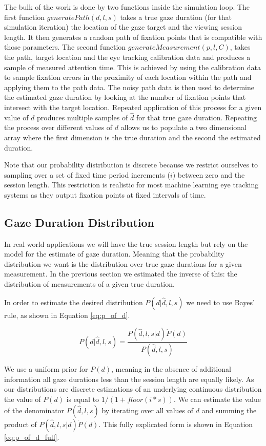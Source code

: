 \documentclass[sigconf]{acmart}
\numberwithin{equation}{section}
\begin{document}
The bulk of the work is done by two functions inside the simulation loop. The first function
$generatePath(d,l,s)$ takes a true gaze duration (for that simulation iteration) the location
of the gaze target and the viewing session length. It then
generates a random path of fixation points that is compatible with those parameters.
The second function 
$generateMeasurement(p,l,C)$, takes the path, target location and the eye tracking calibration 
data and produces a sample of measured attention time.
This is achieved by using the calibration data to sample
fixation errors in the proximity of each location within the path and applying them to the path data. 
The noisy path data is then used to determine
the estimated gaze duration by looking at the number of fixation points that intersect with the target
location.
Repeated application of this process for a given value of $d$ produces multiple samples of $\hat{d}$
for that true gaze duration. Repeating the process over different 
values of $d$ allows us to populate a two dimensional array where the first dimension is the
true duration and the second the estimated duration. 

Note that our probability distribution is discrete
because we restrict ourselves to sampling over a set of fixed time period increments ($i$) 
between zero and the session length. This restriction is realistic for most machine learning
eye tracking systems as they output fixation points at fixed intervals of time.

\subsection{Gaze Duration Distribution}

In real world applications we will have the true session length but rely on the model for the 
estimate of gaze duration. Meaning that the probability distribution we want is the distribution 
over true gaze durations for a given measurement. In the previous section we estimated the inverse of
this: the distribution of measurements of a given true duration. 

In order to estimate the desired distribution $P(d|\hat{d},l,s)$ we need to use 
Bayes' rule, as shown in Equation \ref{eq:p_of_d}.

\begin{equation}
\label{eq:p_of_d}
P(d|\hat{d},l,s) =  \frac{ P(\hat{d},l,s|d) \dot P(d) }{ P(\hat{d},l,s)  }
\end{equation}

We use a uniform prior for $P(d)$, meaning in the absence of additional information all
gaze durations less than the session length are equally likely. As our distributions are
discrete estimations of an underlying continuous distribution the value of $P(d)$ is
equal to $1/(1+floor(i*s))$. We can estimate the value
of the denominator $P(\hat{d},l,s)$ by iterating over all values of $d$ and summing the product
of $ P(\hat{d},l,s|d) \dot P(d)$. This fully explicated form is shown in 
Equation \ref{eq:p_of_d_full}.
\end{document}
